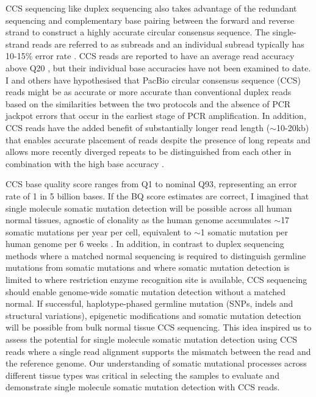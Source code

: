 CCS sequencing like duplex sequencing also takes advantage of the redundant sequencing and complementary base pairing between the forward and reverse strand to construct a highly accurate circular consensus sequence. The single-strand reads are referred to as subreads and an individual subread typically has 10-15\% error rate \cite{Chaisson2012-vr}. CCS reads are reported to have an average read accuracy above Q20 \cite{Wenger2019-pw}, but their individual base accuracies have not been examined to date. I and others have hypothesised that PacBio circular consensus sequence (CCS) reads might be as accurate or more accurate than conventional duplex reads based on the similarities between the two protocols \cite{} and the absence of PCR jackpot errors that occur in the earliest stage of PCR amplification. In addition, CCS reads have the added benefit of substantially longer read length ($\sim$10-20kb) that enables accurate placement of reads despite the presence of long repeats and allows more recently diverged repeats to be distinguished from each other in combination with the high base accuracy \cite{}.

CCS base quality score ranges from Q1 to nominal Q93, representing an error rate of 1 in 5 billion bases. If the BQ score estimates are correct, I imagined that single molecule somatic mutation detection will be possible across all human normal tissues, agnostic of clonality as the human genome accumulates $\sim$17 somatic mutations per year per cell, equivalent to $\sim$1 somatic mutation per human genome per 6 weeks \cite{Mitchell2022-ry}. In addition, in contrast to duplex sequencing methods where a matched normal sequencing is required to distinguish germline mutations from somatic mutations and where somatic mutation detection is limited to where restriction enzyme recognition site is available, CCS sequencing should enable genome-wide somatic mutation detection without a matched normal. If successful, haplotype-phased germline mutation (SNPs, indels and structural variations), epigenetic modifications and somatic mutation detection will be possible from bulk normal tissue CCS sequencing. This idea inspired us to assess the potential for single molecule somatic mutation detection using CCS reads where a single read alignment supports the mismatch between the read and the reference genome. Our understanding of somatic mutational processes across different tissue types was critical in selecting the samples to evaluate and demonstrate single molecule somatic mutation detection with CCS reads. 

